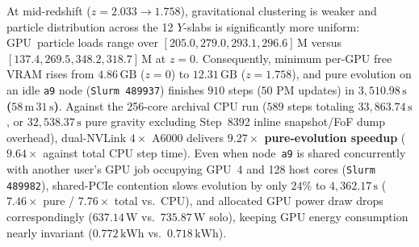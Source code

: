 \documentclass[aps,prd,reprint,superscriptaddress,nofootinbib,amsmath,amssymb,floatfix,longbibliography]{revtex4-2}
\begin{document}
At mid-redshift ($z = 2.033 \rightarrow 1.758$), gravitational clustering is weaker and particle distribution across the 12 $Y$-slabs is significantly more uniform: GPU~particle loads range over $[205.0, 279.0, 293.1, 296.6]\,\mathrm{M}$ versus $[137.4, 269.5, 348.2, 318.7]\,\mathrm{M}$ at $z=0$. Consequently, minimum per-GPU free VRAM rises from $4.86\,\mathrm{GB}$ ($z=0$) to \textbf{$12.31\,\mathrm{GB}$} ($z=1.758$), and pure evolution on an idle \texttt{a9} node (\texttt{Slurm 489937}) finishes $910$ steps ($50$ PM updates) in \textbf{$3{,}510.98\,\mathrm{s}$ ($58\,\mathrm{m}\,31\,\mathrm{s}$)}. Against the 256-core archival CPU run ($589$ steps totaling $33{,}863.74\,\mathrm{s}$, or $32{,}538.37\,\mathrm{s}$ pure gravity excluding Step~8392 inline snapshot/FoF dump overhead), dual-NVLink $4\times$ A6000 delivers \textbf{$9.27\times$ pure-evolution speedup} ($9.64\times$ against total CPU step time). Even when node~\texttt{a9} is shared concurrently with another user's GPU job occupying GPU~4 and 128 host cores (\texttt{Slurm 489982}), shared-PCIe contention slows evolution by only $24\%$ to $4{,}362.17\,\mathrm{s}$ ($7.46\times$ pure / $7.76\times$ total vs.\ CPU), and allocated GPU power draw drops correspondingly ($637.14\,\mathrm{W}$ vs.\ $735.87\,\mathrm{W}$ solo), keeping GPU energy consumption nearly invariant ($0.772\,\mathrm{kWh}$ vs.\ $0.718\,\mathrm{kWh}$).
\end{document}
